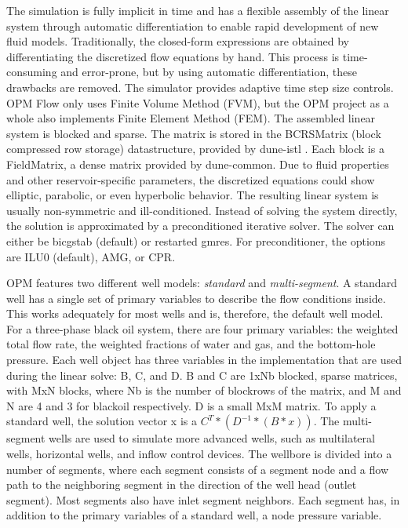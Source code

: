 The simulation is fully implicit in time and has a flexible assembly of the linear system through automatic differentiation to enable rapid development of new fluid models. Traditionally, the closed-form expressions are obtained by differentiating the discretized flow equations by hand. This process is time-consuming and error-prone, but by using automatic differentiation, these drawbacks are removed. The simulator provides adaptive time step size controls. OPM Flow only uses Finite Volume Method (FVM), but the OPM project as a whole also implements Finite Element Method (FEM).%
 The assembled linear system is blocked and sparse. The matrix is stored in the BCRSMatrix (block compressed row storage) datastructure, provided by dune-istl \cite{dune-istl}. Each block is a FieldMatrix, a dense matrix provided by dune-common. Due to fluid properties and other reservoir-specific parameters, the discretized equations could show elliptic, parabolic, or even hyperbolic behavior. The resulting linear system is usually non-symmetric and ill-conditioned.
Instead of solving the system directly, the solution is approximated by a preconditioned iterative solver. The solver can either be bicgstab (default) or restarted gmres. For preconditioner, the options are ILU0 (default), AMG, or CPR.

OPM features two different well models: \textit{standard} and \textit{multi-segment}. A standard well has a single set of primary variables to describe the flow conditions inside. This works adequately for most wells and is, therefore, the default well model. For a three-phase black oil system, there are four primary variables: the weighted total flow rate, the weighted fractions of water and gas, and the bottom-hole pressure. %
 Each well object has three variables in the implementation that are used during the linear solve: B, C, and D. B and C are 1xNb blocked, sparse matrices, with MxN blocks, where Nb is the number of blockrows of the matrix, and M and N are 4 and 3 for blackoil respectively. D is a small MxM matrix. To apply a standard well, the solution vector x is a $C^T * (D^{-1} * (B * x))$. The multi-segment wells are used to simulate more advanced wells, such as multilateral wells, horizontal wells, and inflow control devices. The wellbore is divided into a number of segments, where each segment consists of a segment node and a flow path to the neighboring segment in the direction of the well head (outlet segment). Most segments also have inlet segment neighbors. Each segment has, in addition to the primary variables of a standard well, a node pressure variable.

